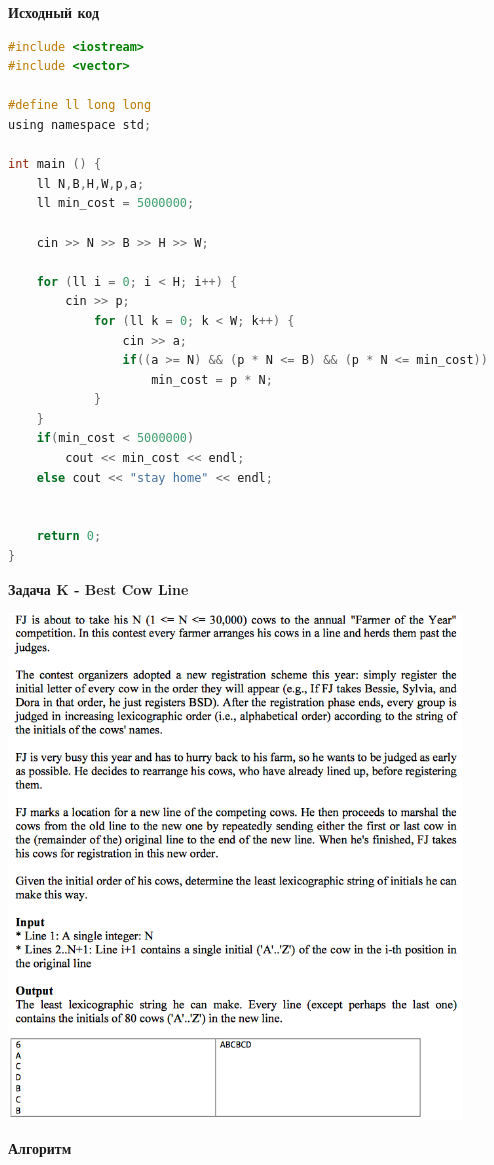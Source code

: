 \documentclass[a4paper,12pt]{article}
\begin{document}
\newpage
\textbf{{\large Исходный код}} \\
\begin{lstlisting}[language=C]
#include <iostream>
#include <vector>

#define ll long long
using namespace std;

int main () {
    ll N,B,H,W,p,a;
    ll min_cost = 5000000;

    cin >> N >> B >> H >> W;

    for (ll i = 0; i < H; i++) {
        cin >> p;
            for (ll k = 0; k < W; k++) {
                cin >> a;
                if((a >= N) && (p * N <= B) && (p * N <= min_cost))
                    min_cost = p * N;
            }
    }
    if(min_cost < 5000000)
        cout << min_cost << endl;
    else cout << "stay home" << endl;


    return 0;
}
\end{lstlisting}


\newpage
\textbf{{\large Задача K - Best Cow Line}}

\begin{center}
\includegraphics[width=0.9\textwidth]{CT_S02E03/CT_S02E03_K.png}\\ [1cm]
\end{center}

\textbf{{\large Алгоритм}}
\end{document}
